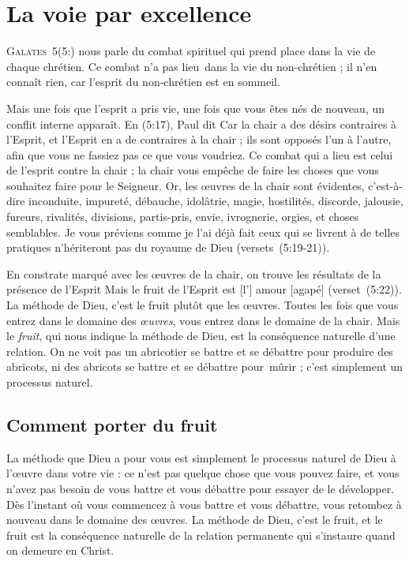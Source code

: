 \chapter{La voie par excellence}

\lettrine{G}{alates~5}(5:) nous parle du
 combat spirituel
 qui prend place dans la vie de chaque chrétien.
 Ce combat n'a pas lieu~dans la vie du non-chrétien ;
 il n'en connaît rien, car l'esprit du non-chrétien est en sommeil.

Mais une fois que l'esprit a pris vie, une fois que vous êtes nés de nouveau,
 un conflit interne apparaît. En (5:17), Paul dit\frcolon{}
 \Og Car la chair a des désirs contraires à l'Esprit,
 et l'Esprit en a de contraires à la chair ; ils sont opposés l'un à l'autre,
 afin que vous ne fassiez pas ce que vous voudriez. \Fg{}
 Ce combat qui a lieu est celui de l'esprit contre la chair ;
 la chair vous empêche de faire les choses que vous souhaitez
 faire pour le Seigneur.
 \Og Or, les œuvres de la chair sont évidentes, c'est-à-dire inconduite,
 impureté, débauche, idolâtrie, magie, hostilités, discorde, jalousie,
 fureurs, rivalités, divisions, partis-pris, envie, ivrognerie, orgies,
 et choses semblables. Je vous préviens comme je l'ai déjà fait\frcolon{}
 ceux qui se livrent à de telles pratiques n'hériteront pas
 du royaume de Dieu \Fg{} (versets~(5:19-21)).

En constrate marqué avec les œuvres de la chair, on trouve les résultats
 de la présence de l'Esprit\frcolon{} \Og Mais le fruit de l'Esprit est [l'] amour [agapé] \Fg{}
 (verset~(5:22)). La méthode de Dieu, c'est le fruit
 plutôt que les œuvres. Toutes les fois que vous entrez dans le domaine
 des \emph{œuvres}, vous entrez dans le domaine de la chair.
 Mais le \emph{fruit}, qui nous indique la méthode de Dieu, est la conséquence
 naturelle d'une relation. On ne voit pas un abricotier se battre et se débattre
 pour produire des abricots, ni des abricots se battre et se débattre
 pour~mûrir ; c'est simplement un processus naturel.


\section{Comment porter du fruit}

La méthode que Dieu a pour vous est simplement le processus naturel
 de Dieu à l'œuvre dans votre vie : ce n'est pas quelque chose
 que vous pouvez faire, et vous n'avez pas besoin de vous battre
 et vous débattre pour essayer de le développer.
 Dès l'instant où vous commencez à vous battre et vous débattre,
 vous retombez à nouveau dans le domaine des œuvres.
 La méthode de Dieu, c'est le fruit, et le fruit est la conséquence
 naturelle de la relation permanente qui s'instaure quand
 \Og on demeure en Christ. \Fg{}

